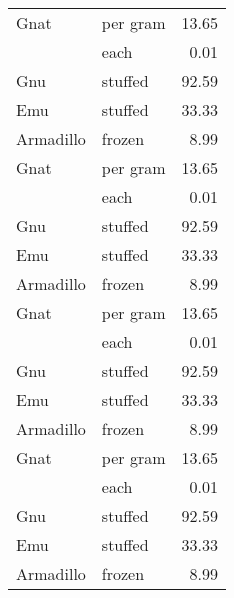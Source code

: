 {
\large
{}

\tablelasttail{}
\begin{center}
\begin{xtabular}{|l||l|r|}
Gnat      & per gram & 13.65 \\
          & each     & 0.01  \\
Gnu       & stuffed  & 92.59 \\
Emu       & stuffed  & 33.33 \\
Armadillo & frozen   & 8.99  \\
Gnat      & per gram & 13.65 \\
          & each     & 0.01  \\
Gnu       & stuffed  & 92.59 \\
Emu       & stuffed  & 33.33 \\
Armadillo & frozen   & 8.99  \\
Gnat      & per gram & 13.65 \\
          & each     & 0.01  \\
Gnu       & stuffed  & 92.59 \\
Emu       & stuffed  & 33.33 \\
Armadillo & frozen   & 8.99  \\
Gnat      & per gram & 13.65 \\
          & each     & 0.01  \\
Gnu       & stuffed  & 92.59 \\
Emu       & stuffed  & 33.33 \\
Armadillo & frozen   & 8.99  \\

\end{xtabular}
\end{center}}
